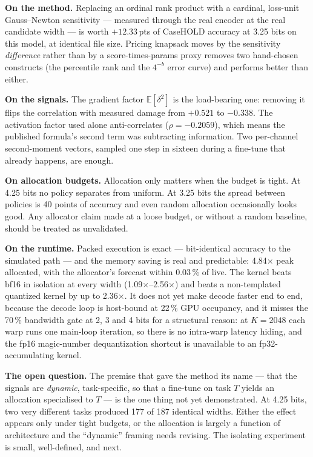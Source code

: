 \documentclass[11pt]{article}
\newcommand{\x}{$\times$}
\newcommand{\pt}{\,pts}
\newcommand{\pct}{\,\%}
\begin{document}
\textbf{On the method.} Replacing an ordinal rank product with a cardinal, loss-unit
Gauss--Newton sensitivity --- measured through the real encoder at the real candidate width --- is
worth $+12.33$\pt{} of CaseHOLD accuracy at 3.25 bits on this model, at identical file size.
Pricing knapsack moves by the sensitivity \emph{difference} rather than by a score-times-params
proxy removes two hand-chosen constructs (the percentile rank and the $4^{-b}$ error curve) and
performs better than either.

\textbf{On the signals.} The gradient factor $\mathbb{E}[\delta^2]$ is the load-bearing one:
removing it flips the correlation with measured damage from $+0.521$ to $-0.338$. The activation
factor used alone anti-correlates ($\rho = -0.2059$), which means the published formula's second
term was subtracting information. Two per-channel second-moment vectors, sampled one step in
sixteen during a fine-tune that already happens, are enough.

\textbf{On allocation budgets.} Allocation only matters when the budget is tight. At 4.25 bits no
policy separates from uniform. At 3.25 bits the spread between policies is 40 points of accuracy
and even random allocation occasionally looks good. Any allocator claim made at a loose budget,
or without a random baseline, should be treated as unvalidated.

\textbf{On the runtime.} Packed execution is exact --- bit-identical accuracy to the simulated
path --- and the memory saving is real and predictable: 4.84\x{} peak allocated, with the
allocator's forecast within 0.03\pct{} of live. The kernel beats bf16 in isolation at every width
(1.09\x--2.56\x) and beats a non-templated quantized kernel by up to 2.36\x. It does not yet make
decode faster end to end, because the decode loop is host-bound at 22\pct{} GPU occupancy, and it
misses the 70\pct{} bandwidth gate at 2, 3 and 4 bits for a structural reason: at $K = 2048$ each
warp runs one main-loop iteration, so there is no intra-warp latency hiding, and the fp16
magic-number dequantization shortcut is unavailable to an fp32-accumulating kernel.

\textbf{The open question.} The premise that gave the method its name --- that the signals are
\emph{dynamic}, task-specific, so that a fine-tune on task $T$ yields an allocation specialised
to $T$ --- is the one thing not yet demonstrated. At 4.25 bits, two very different tasks produced
177 of 187 identical widths. Either the effect appears only under tight budgets, or the
allocation is largely a function of architecture and the ``dynamic'' framing needs revising. The
isolating experiment is small, well-defined, and next.
\end{document}

